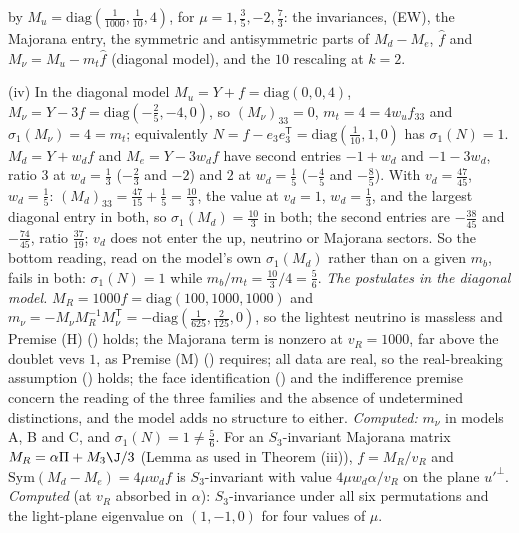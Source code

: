 by $M_{u} = \mathrm{diag}(\tfrac{1}{1000}, \tfrac{1}{10}, 4)$, for $\mu = 1, \tfrac35, -2, \tfrac73$: the invariances, (EW), the Majorana entry, the symmetric and antisymmetric parts of $M_{d} - M_{e}$, $\hat{f}$ and $M_{\nu} = M_{u} - m_{t}\hat{f}$ (diagonal model), and the $10$ rescaling at $k = 2$.

(iv) In the diagonal model $M_{u} = Y + f = \mathrm{diag}(0, 0, 4)$, $M_{\nu} = Y - 3f = \mathrm{diag}(-\tfrac25, -4, 0)$, so $(M_{\nu})_{33} = 0$, $m_{t} = 4 = 4w_{u}f_{33}$ and $\sigma_{1}(M_{\nu}) = 4 = m_{t}$; equivalently $N = \hat{f} - e_{3}e_{3}^{\mathsf{T}} = \mathrm{diag}(\tfrac{1}{10}, 1, 0)$ has $\sigma_{1}(N) = 1$. $M_{d} = Y + w_{d}f$ and $M_{e} = Y - 3w_{d}f$ have second entries $-1 + w_{d}$ and $-1 - 3w_{d}$, ratio $3$ at $w_{d} = \tfrac13$ ($-\tfrac23$ and $-2$) and $2$ at $w_{d} = \tfrac15$ ($-\tfrac45$ and $-\tfrac85$). With $v_{d} = \tfrac{47}{45}$, $w_{d} = \tfrac15$: $(M_{d})_{33} = \tfrac{47}{15} + \tfrac15 = \tfrac{10}{3}$, the value at $v_{d} = 1$, $w_{d} = \tfrac13$, and the largest diagonal entry in both, so $\sigma_{1}(M_{d}) = \tfrac{10}{3}$ in both; the second entries are $-\tfrac{38}{45}$ and $-\tfrac{74}{45}$, ratio $\tfrac{37}{19}$; $v_{d}$ does not enter the up, neutrino or Majorana sectors. So the bottom reading, read on the model's own $\sigma_{1}(M_{d})$ rather than on a given $m_{b}$, fails in both: $\sigma_{1}(N) = 1$ while $m_{b}/m_{t} = \tfrac{10}{3}/4 = \tfrac56$. \emph{The postulates in the diagonal model.} $M_{R} = 1000f = \mathrm{diag}(100, 1000, 1000)$ and $m_{\nu} = -M_{\nu}M_{R}^{-1}M_{\nu}^{\mathsf{T}} = -\mathrm{diag}(\tfrac{1}{625}, \tfrac{2}{125}, 0)$, so the lightest neutrino is massless and Premise (H) () holds; the Majorana term is nonzero at $v_{R} = 1000$, far above the doublet vevs $1$, as Premise (M) () requires; all data are real, so the real-breaking assumption () holds; the face identification () and the indifference premise concern the reading of the three families and the absence of undetermined distinctions, and the model adds no structure to either. \emph{Computed:} $m_{\nu}$ in models A, B and C, and $\sigma_{1}(N) = 1 \neq \tfrac56$. For an $S_{3}$-invariant Majorana matrix $M_{R} = \alpha\Pi + M_{3}\J/3$ (Lemma  as used in Theorem (iii)), $f = M_{R}/v_{R}$ and $\mathrm{Sym}(M_{d} - M_{e}) = 4\mu w_{d}f$ is $S_{3}$-invariant with value $4\mu w_{d}\alpha/v_{R}$ on the plane $u'^{\perp}$. \emph{Computed} (at $v_{R}$ absorbed in $\alpha$): $S_{3}$-invariance under all six permutations and the light-plane eigenvalue on $(1, -1, 0)$ for four values of $\mu$.

